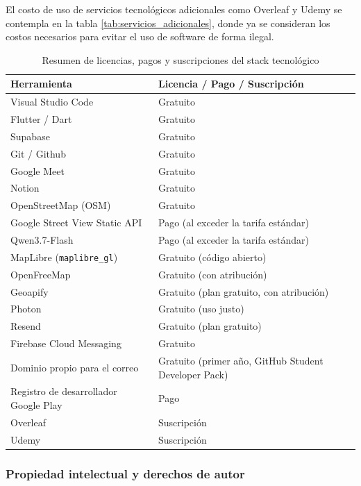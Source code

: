 El costo de uso de servicios tecnológicos adicionales como Overleaf y Udemy se contempla en la tabla \ref{tab:servicios_adicionales}, donde ya se consideran los costos necesarios para evitar el uso de software de forma ilegal. 

\begin{table}[htbp]
\centering
\caption{Resumen de licencias, pagos y suscripciones del stack tecnológico}
\label{tab:licencias_fact}
\begin{tabular}{|>{\raggedright\arraybackslash}p{}|>{\raggedright\arraybackslash}p{}|}
\hline
\textbf{\centering Herramienta} & \textbf{\centering Licencia / Pago / Suscripción} \\ \hline
Visual Studio Code & Gratuito  \\ \hline
Flutter / Dart & Gratuito  \\ \hline
Supabase & Gratuito  \\ \hline
Git / Github & Gratuito  \\ \hline
Google Meet & Gratuito  \\ \hline
Notion & Gratuito  \\ \hline
OpenStreetMap (OSM) & Gratuito  \\ \hline
Google Street View Static API & Pago (al exceder la tarifa estándar) \\ \hline
Qwen3.7-Flash & Pago (al exceder la tarifa estándar) \\ \hline
MapLibre (\texttt{maplibre\_gl}) & Gratuito (código abierto) \\ \hline
OpenFreeMap & Gratuito (con atribución) \\ \hline
Geoapify & Gratuito (plan gratuito, con atribución) \\ \hline
Photon & Gratuito (uso justo) \\ \hline
Resend & Gratuito (plan gratuito) \\ \hline
Firebase Cloud Messaging & Gratuito \\ \hline
Dominio propio para el correo & Gratuito (primer año, GitHub Student Developer Pack) \\ \hline
Registro de desarrollador Google Play & Pago \\ \hline
Overleaf & Suscripción \\ \hline
Udemy & Suscripción \\ \hline
\end{tabular}
\end{table}

\subsubsection{Propiedad intelectual y derechos de autor}


